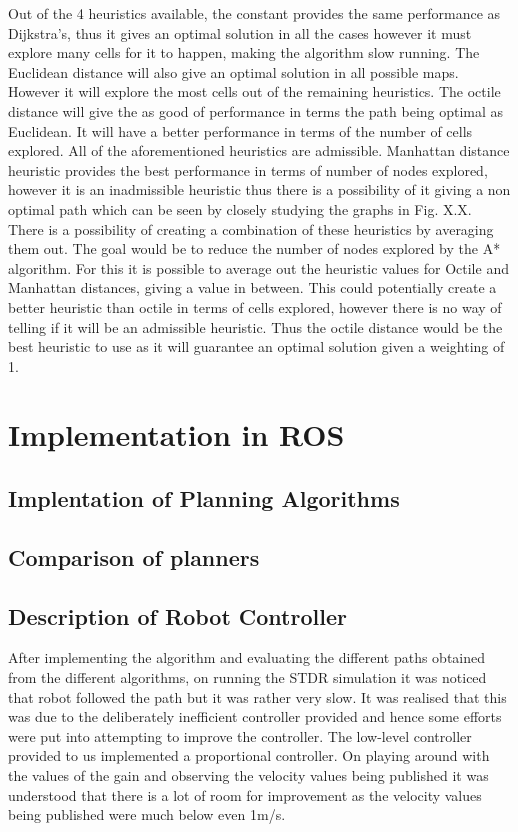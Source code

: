 \documentclass[a4paper,12pt]{article}
\begin{document}
				Out of the 4 heuristics available, the constant provides the same performance as Dijkstra’s, thus it gives an optimal solution in all the cases however it must explore many cells for it to happen, making the algorithm slow running. The Euclidean distance will also give an optimal solution in all possible maps. However it will explore the most cells out of the remaining heuristics. The octile distance will give the as good of performance in terms the path being optimal as Euclidean. It will have a better performance in terms of the number of cells explored. All of the aforementioned heuristics are admissible. Manhattan distance heuristic provides the best performance in terms of number of nodes explored, however it is an inadmissible heuristic thus there is a possibility of it giving a non optimal path which can be seen by closely studying the graphs in Fig. X.X.
				\\
				There is a possibility of creating a combination of these heuristics by averaging them out. The goal would be to reduce the number of nodes explored by the A* algorithm. For this it is possible to average out the heuristic values for Octile and Manhattan distances, giving a value in between. This could potentially create a better heuristic than octile in terms of cells explored, however there is no way of telling if it will be an admissible heuristic. Thus the octile distance would be the best heuristic to use as it will guarantee an optimal solution given a weighting of 1. 

	\section{Implementation in ROS}
	
		\subsection{Implentation of Planning Algorithms}
		
		\subsection{Comparison of planners}
		
		\subsection{Description of Robot Controller}
		After implementing the algorithm and evaluating the different paths obtained from the different algorithms, on running the STDR simulation it was noticed that robot followed the path but it was rather very slow. It was realised that this was due to the deliberately inefficient controller provided and hence some efforts were put into attempting to improve the controller.
		The low-level controller provided to us implemented a proportional controller. On playing around with the values of the gain and observing the velocity values being published it was understood that there is a lot of room for improvement as the velocity values being published were much below even 1m/s. 
		
\end{document}
